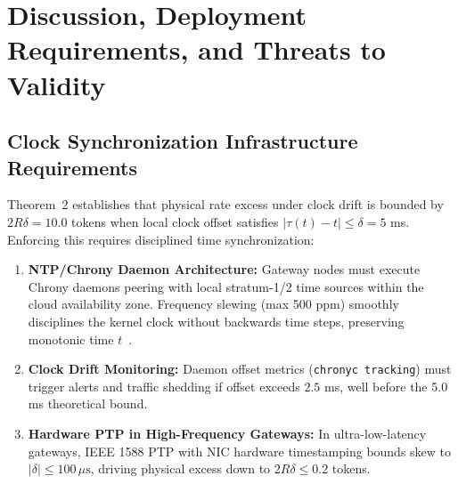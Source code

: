 \documentclass[conference]{IEEEtran}
\begin{document}
\section{Discussion, Deployment Requirements, and Threats to Validity}

\subsection{Clock Synchronization Infrastructure Requirements}
Theorem~2 establishes that physical rate excess under clock drift is bounded by $2R\delta = 10.0$ tokens when local clock offset satisfies $|\tau(t) - t| \le \delta = 5$ ms. Enforcing this requires disciplined time synchronization:
\begin{enumerate}
    \item \textbf{NTP/Chrony Daemon Architecture:} Gateway nodes must execute Chrony daemons peering with local stratum-1/2 time sources within the cloud availability zone. Frequency slewing (max 500 ppm) smoothly disciplines the kernel clock without backwards time steps, preserving monotonic time $t$~\cite{mills1991internet}.
    \item \textbf{Clock Drift Monitoring:} Daemon offset metrics (\texttt{chronyc tracking}) must trigger alerts and traffic shedding if offset exceeds $2.5$ ms, well before the 5.0 ms theoretical bound.
    \item \textbf{Hardware PTP in High-Frequency Gateways:} In ultra-low-latency gateways, IEEE 1588 PTP with NIC hardware timestamping bounds skew to $|\delta| \le 100\,\mu\text{s}$, driving physical excess down to $2R\delta \le 0.2$ tokens.
\end{enumerate}
\end{document}
